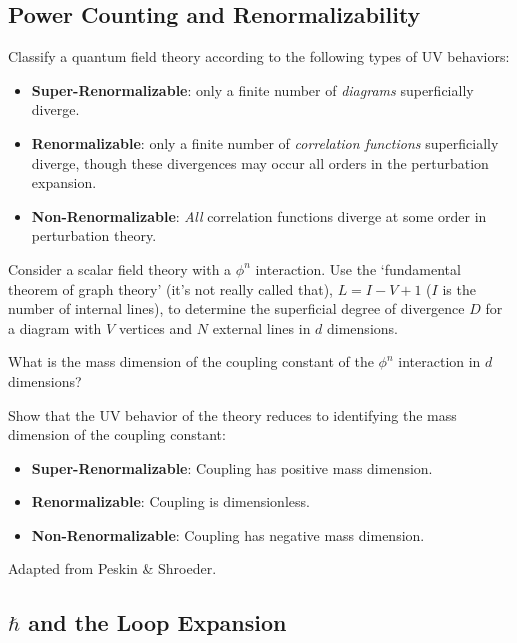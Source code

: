 \documentclass[12pt]{article}
\numberwithin{equation}{subsection}    %
\begin{document}
\subsection{Power Counting and Renormalizability}

Classify a quantum field theory according to the following types of UV behaviors:
\begin{itemize}
	\item \textbf{Super-Renormalizable}: only a finite number of \emph{diagrams} superficially diverge.
	
	\item \textbf{Renormalizable}: only a finite number of \emph{correlation functions} superficially diverge, though these divergences may occur all orders in the perturbation expansion.

	\item \textbf{Non-Renormalizable}: \emph{All} correlation functions diverge at some order in perturbation theory. 
\end{itemize}

Consider a scalar field theory with a $\phi^n$ interaction.
%
Use the `fundamental theorem of graph theory' (it's not really called that), $L=I-V+1$ ($I$ is the number of internal lines), to determine the superficial degree of divergence $D$ for a diagram with $V$ vertices and $N$ external lines in $d$ dimensions.

What is the mass dimension of the coupling constant of the $\phi^n$ interaction in $d$ dimensions?

Show that the UV behavior of the theory reduces to identifying the mass dimension of the coupling constant:
\begin{itemize}
	\item \textbf{Super-Renormalizable}: Coupling has positive mass dimension.
	
	\item \textbf{Renormalizable}: Coupling is dimensionless.

	\item \textbf{Non-Renormalizable}: Coupling has negative mass dimension.
\end{itemize}


{\footnotesize Adapted from Peskin \& Shroeder.}


\subsection{\texorpdfstring{$\hbar$}{h-bar} and the Loop Expansion}
\end{document}
